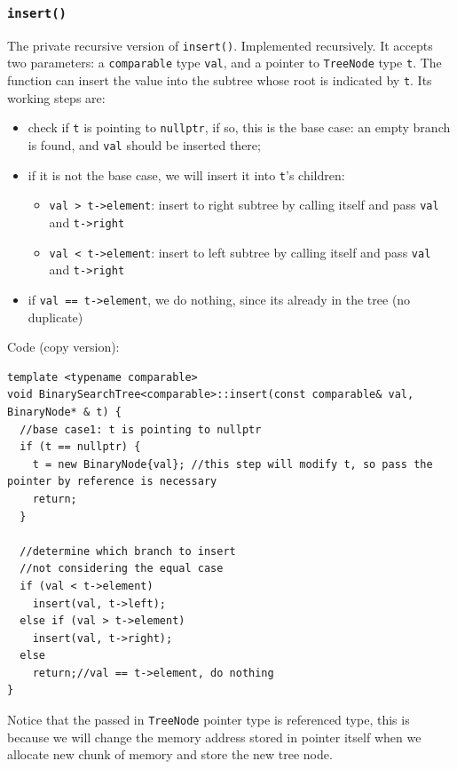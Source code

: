 \documentclass[12pt]{book}
\begin{document}
\subsubsection{\texttt{insert()}}
\label{sec:org5a23f9e}
The private recursive version of \texttt{insert()}. Implemented recursively. It accepts two parameters: a \texttt{comparable} type \texttt{val}, and a pointer to \texttt{TreeNode} type \texttt{t}. The function can insert the value into the subtree whose root is indicated by \texttt{t}. Its working steps are:
\begin{itemize}
\item check if \texttt{t} is pointing to \texttt{nullptr}, if so, this is the base case: an empty branch is found, and \texttt{val} should be inserted there;
\item if it is not the base case, we will insert it into \texttt{t}'s children:
\begin{itemize}
\item \texttt{val > t->element}: insert to right subtree by calling itself and pass \texttt{val} and \texttt{t->right}
\item \texttt{val < t->element}: insert to left subtree by calling itself and pass \texttt{val} and \texttt{t->right}
\end{itemize}
\item if \texttt{val == t->element}, we do nothing, since its already in the tree (no duplicate)
\end{itemize}

Code (copy version):
\begin{verbatim}
template <typename comparable>
void BinarySearchTree<comparable>::insert(const comparable& val, BinaryNode* & t) {  
  //base case1: t is pointing to nullptr
  if (t == nullptr) {
    t = new BinaryNode{val}; //this step will modify t, so pass the pointer by reference is necessary
    return;
  }

  //determine which branch to insert 
  //not considering the equal case 
  if (val < t->element)
    insert(val, t->left);
  else if (val > t->element)
    insert(val, t->right);
  else
    return;//val == t->element, do nothing
}
\end{verbatim}

Notice that the passed in \texttt{TreeNode} pointer type is referenced type, this is because we will change the memory address stored in pointer itself when we allocate new chunk of memory and store the new tree node.
\end{document}

